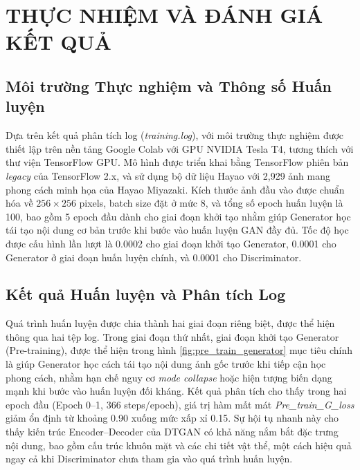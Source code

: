 
\setcounter{chapter}{2}
\chapter[{THỰC NHIỆM VÀ ĐÁNH GIÁ KẾT QUẢ}]{THỰC NHIỆM VÀ ĐÁNH GIÁ KẾT QUẢ}

\section{Môi trường Thực nghiệm và Thông số Huấn luyện}

Dựa trên kết quả phân tích log (\textit{training.log}), với môi trường thực nghiệm được thiết lập trên 
nền tảng Google Colab với GPU NVIDIA Tesla T4, tương thích với thư viện TensorFlow GPU. 
Mô hình được triển khai bằng TensorFlow phiên bản \textit{legacy} của TensorFlow 2.x, và sử dụng bộ dữ 
liệu Hayao với 2{,}929 ảnh mang phong cách minh họa của Hayao Miyazaki. Kích thước ảnh đầu vào được 
chuẩn hóa về \(256 \times 256\) pixels, batch size đặt ở mức 8, và tổng số epoch huấn luyện là 100, 
bao gồm 5 epoch đầu dành cho giai đoạn khởi tạo nhằm giúp Generator học tái tạo nội dung cơ bản trước
khi bước vào huấn luyện GAN đầy đủ. Tốc độ học được cấu hình lần lượt là 0.0002 cho giai đoạn khởi 
tạo Generator, 0.0001 cho Generator ở giai đoạn huấn luyện chính, và 0.0001 cho Discriminator.


\section{Kết quả Huấn luyện và Phân tích Log}

Quá trình huấn luyện được chia thành hai giai đoạn riêng biệt, được thể hiện thông qua hai tệp log. 
Trong giai đoạn thứ nhất, giai đoạn khởi tạo Generator (Pre-training), được thể hiện trong 
hình \ref{fig:pre_train_generator}
mục tiêu chính là giúp Generator học cách tái tạo nội dung ảnh gốc 
trước khi tiếp cận học phong cách, nhằm hạn chế nguy cơ \textit{mode collapse} hoặc hiện tượng biến 
dạng mạnh khi bước vào huấn luyện đối kháng. Kết quả phân tích cho thấy trong hai epoch đầu 
(Epoch 0--1, 366 steps/epoch), giá trị hàm mất mát \textit{Pre\_train\_G\_loss} giảm ổn định từ khoảng 0.90 xuống mức
xấp xỉ 0.15. Sự hội tụ nhanh này cho thấy kiến trúc Encoder--Decoder của DTGAN có khả năng nắm bắt 
đặc trưng nội dung, bao gồm cấu trúc khuôn mặt và các chi tiết vật thể, một cách hiệu quả ngay cả 
khi Discriminator chưa tham gia vào quá trình huấn luyện.

